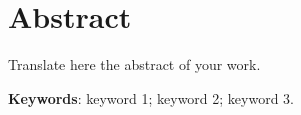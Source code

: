 \chapter*{Abstract}

	\noindent Translate here the abstract of your work.
	
	\vspace{5mm}
	
	\noindent\textbf{Keywords}: keyword 1; keyword 2; keyword 3.
	
	\thispagestyle{empty}
	